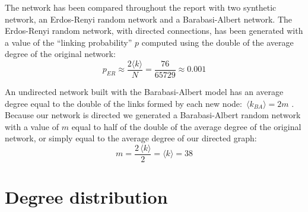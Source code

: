 \documentclass[11pt, twoside]{report}
\begin{document}
The network has been compared throughout the report with two synthetic network, an Erdos-Renyi random network and a Barabasi-Albert network.
The Erdos-Renyi random network, with directed connections, has been generated with a value of the ``linking probability'' $p$ computed using the double of the average degree of the original network:
    \begin{equation}
      p_{ER} \approx \frac{2\langle k  \rangle}{N} = \frac{76}{65729} \approx  0.001
      \label{eq:ER_probability}
    \end{equation}

 An undirected network built with the Barabasi-Albert model  has an average degree equal to the double of the links formed by each new node: $ \, \langle k_{BA} \rangle = 2 m$ \cite{network_science}. Because our network is directed we generated a Barabasi-Albert random network with a value of $m$ equal to half of the double of the average degree of the original network, or simply equal to the average degree of our directed graph:
    \begin{equation}
      m = \frac{ 2 \, \langle k \rangle}{2} =  \langle k \rangle = 38
      \label{eq:BA_model}
    \end{equation}

    
 \section{Degree distribution}    
\end{document}
